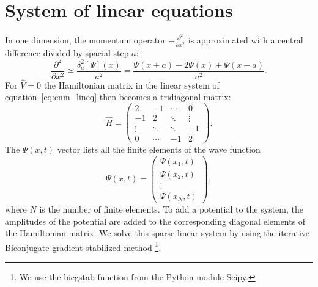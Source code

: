 
\section{System of linear equations}
In one dimension, the momentum operator $-\frac{\partial^2}{\partial x^2}$ is approximated with a central difference divided by spacial step $a$:
\[
    \frac{\partial^2}{\partial x^2}
    \simeq \frac{\delta_a^2[\Psi](x)}{a^2} 
    = \frac{\Psi(x+a)-2\Psi(x)+\Psi(x-a)}{a^2}.
\]For $\hat{V}=0$ the Hamiltonian matrix in the linear system of equation~\ref{eq:cnm_lineq} then becomes a tridiagonal matrix:
\[
\hat{H} =
 \begin{pmatrix}
    2       & -1     & \cdots & 0       \\
    -1      & 2      & \ddots & \vdots  \\
    \vdots  & \ddots & \ddots & -1      \\
    0       & \cdots & -1     & 2
 \end{pmatrix}.
 \] The $\Psi(x,t)$ vector lists all the finite elements of the wave function
 \[
\Psi(x,t) =
 \begin{pmatrix}
    \Psi(x_1,t)   \\
    \Psi(x_2,t)   \\
    \vdots      \\
    \Psi(x_N,t)
 \end{pmatrix},
 \] where $N$ is the number of finite elements. To add a potential to the system, the amplitudes of the potential are added to the corresponding diagonal elements of the Hamiltonian matrix. We solve this sparse linear system by using the iterative Biconjugate gradient stabilized method \footnote{We use the bicgstab function from the Python module Scipy.}.
 
